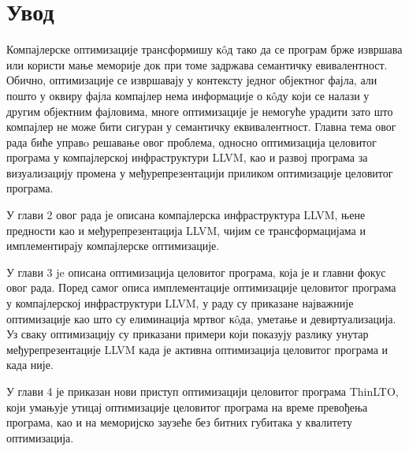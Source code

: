 \documentclass[12pt,oneside]{memoir}
\begin{document}
\frontmatter
\naslovna
\komisija
\tableofcontents*

\mainmatter

\chapter{Увод}

Компајлерске оптимизације трансформишу к\^{o}д тако да се програм брже извршава
или користи мање меморије док при томе задржава семантичку евивалентност.
Обично, оптимизације се извршавају у контексту једног објектног фајла, али
пошто у оквиру фајла компајлер нема информације о к\^{o}ду који се налази у 
другим објектним фајловима, многе оптимизације је немогуће урадити зато што компајлер
не може бити сигуран у семантичку еквивалентност.
Главна тема овог рада биће управo решавање овог проблема, односно оптимизација
целовитог програма у компајлерској инфраструктури LLVM, као и развој програма
за визуализацију промена у међурепрезентацији приликом оптимизације
целовитог програма.

У глави 2 овог рада је описана компајлерска инфраструктура LLVM, њене предности
као и међурепрезентација LLVM, чијим се трансформацијама и имплементирају
компајлерске оптимизације.

У глави 3 je описана оптимизација целовитог програма, која је и главни
фокус овог рада.
Поред самог описа имплементације оптимизације целовитог програма у 
компајлерској инфраструктури LLVM, у раду су приказане најважније оптимизације
као што су елиминација мртвог к\^{o}да, уметање и девиртуализација.
Уз сваку оптимизацију су приказани примери који показују разлику унутар 
међурепрезентације LLVM када је активна оптимизација целовитог програма
и када није.

У глави 4 је приказан нови приступ оптимизацији целовитог програма ThinLTO,
који умањује утицај оптимизације целовитог програма на време превођења програма,
као и на меморијско заузеће без битних губитака у квалитету оптимизација.
\end{document}

